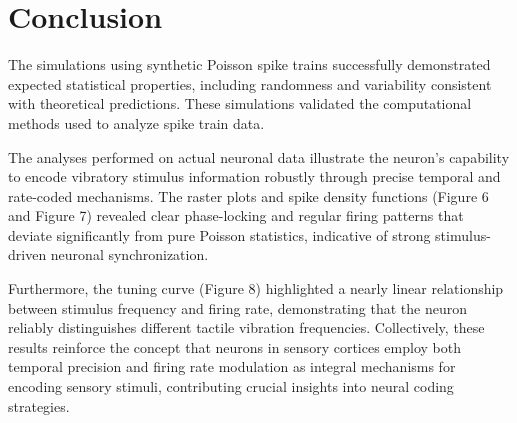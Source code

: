 \documentclass{article}
\begin{document}
\section{Conclusion}

The simulations using synthetic Poisson spike trains successfully demonstrated expected statistical properties, including randomness and variability consistent with theoretical predictions. These simulations validated the computational methods used to analyze spike train data.

The analyses performed on actual neuronal data illustrate the neuron's capability to encode vibratory stimulus information robustly through precise temporal and rate-coded mechanisms. The raster plots and spike density functions (Figure 6 and Figure 7) revealed clear phase-locking and regular firing patterns that deviate significantly from pure Poisson statistics, indicative of strong stimulus-driven neuronal synchronization. 

Furthermore, the tuning curve (Figure 8) highlighted a nearly linear relationship between stimulus frequency and firing rate, demonstrating that the neuron reliably distinguishes different tactile vibration frequencies. Collectively, these results reinforce the concept that neurons in sensory cortices employ both temporal precision and firing rate modulation as integral mechanisms for encoding sensory stimuli, contributing crucial insights into neural coding strategies.
\end{document}
